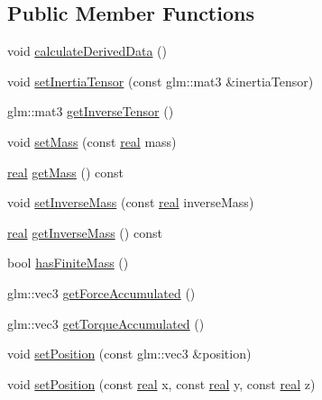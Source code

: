 \subsection*{Public Member Functions}
\begin{DoxyCompactItemize}
\item 
void \hyperlink{classrum_1_1_rigid_body_a3f14dfc9bb7dcfc961373b8f7cb71dc9}{calculate\+Derived\+Data} ()
\item 
void \hyperlink{classrum_1_1_rigid_body_a15fd4045586f493df7611c7d362bff16}{set\+Inertia\+Tensor} (const glm\+::mat3 \&inertia\+Tensor)
\item 
glm\+::mat3 \hyperlink{classrum_1_1_rigid_body_a116880f250df7efe113f87b189fdfca5}{get\+Inverse\+Tensor} ()
\item 
void \hyperlink{classrum_1_1_rigid_body_ac71fd21db22c1a36a32c03d342dd6dbe}{set\+Mass} (const \hyperlink{namespacerum_a7e8cca23573d5eaead0f138cbaa4862c}{real} mass)
\item 
\hyperlink{namespacerum_a7e8cca23573d5eaead0f138cbaa4862c}{real} \hyperlink{classrum_1_1_rigid_body_a07818ed12a3e223b40191a5d934a2c94}{get\+Mass} () const
\item 
void \hyperlink{classrum_1_1_rigid_body_a3fb4c29e486be6984d0f7a21a7bede06}{set\+Inverse\+Mass} (const \hyperlink{namespacerum_a7e8cca23573d5eaead0f138cbaa4862c}{real} inverse\+Mass)
\item 
\hyperlink{namespacerum_a7e8cca23573d5eaead0f138cbaa4862c}{real} \hyperlink{classrum_1_1_rigid_body_a4c1a53f80f22157d60037099bb54544a}{get\+Inverse\+Mass} () const
\item 
bool \hyperlink{classrum_1_1_rigid_body_abc90d8e280d6f0724cda920c78ae4927}{has\+Finite\+Mass} ()
\item 
glm\+::vec3 \hyperlink{classrum_1_1_rigid_body_ad13fc4c6b7b199a62ab85a716077ac27}{get\+Force\+Accumulated} ()
\item 
glm\+::vec3 \hyperlink{classrum_1_1_rigid_body_a9868612d7d60df7abfde0b657d3bad78}{get\+Torque\+Accumulated} ()
\item 
void \hyperlink{classrum_1_1_rigid_body_a7511dfe4f717b8217ae38ced29116a21}{set\+Position} (const glm\+::vec3 \&position)
\item 
void \hyperlink{classrum_1_1_rigid_body_afc0f30fdfffeabbda5b59d96a571b9ac}{set\+Position} (const \hyperlink{namespacerum_a7e8cca23573d5eaead0f138cbaa4862c}{real} x, const \hyperlink{namespacerum_a7e8cca23573d5eaead0f138cbaa4862c}{real} y, const \hyperlink{namespacerum_a7e8cca23573d5eaead0f138cbaa4862c}{real} z)
\item 

\end{DoxyCompactItemize}
